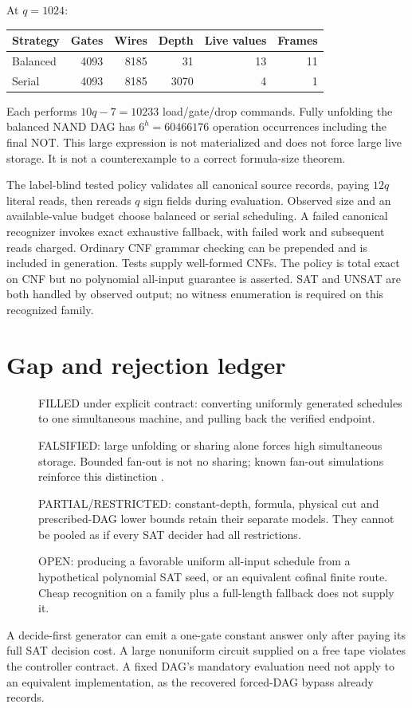 \documentclass[11pt]{article}
\begin{document}
At $q=1024$:
\begin{center}\begin{tabular}{lrrrrr}\toprule
Strategy&Gates&Wires&Depth&Live values&Frames\\\midrule
Balanced&4093&8185&31&13&11\\
Serial&4093&8185&3070&4&1\\\bottomrule
\end{tabular}\end{center}
Each performs $10q-7=10233$ load/gate/drop commands. Fully unfolding the balanced NAND DAG has $6^h=60466176$ operation occurrences including the final NOT. This large expression is not materialized and does not force large live storage. It is not a counterexample to a correct formula-size theorem.

The label-blind tested policy validates all canonical source records, paying $12q$ literal reads, then rereads $q$ sign fields during evaluation. Observed size and an available-value budget choose balanced or serial scheduling. A failed canonical recognizer invokes exact exhaustive fallback, with failed work and subsequent reads charged. Ordinary CNF grammar checking can be prepended and is included in generation. Tests supply well-formed CNFs. The policy is total exact on CNF but no polynomial all-input guarantee is asserted. SAT and UNSAT are both handled by observed output; no witness enumeration is required on this recognized family.

\section{Gap and rejection ledger}
\begin{description}
\item[] FILLED under explicit contract: converting uniformly generated schedules to one simultaneous machine, and pulling back the verified endpoint.
\item[] FALSIFIED: large unfolding or sharing alone forces high simultaneous storage. Bounded fan-out is not no sharing; known fan-out simulations reinforce this distinction \cite{fanout}.
\item[] PARTIAL/RESTRICTED: constant-depth, formula, physical cut and prescribed-DAG lower bounds retain their separate models. They cannot be pooled as if every SAT decider had all restrictions.
\item[] OPEN: producing a favorable uniform all-input schedule from a hypothetical polynomial SAT seed, or an equivalent cofinal finite route. Cheap recognition on a family plus a full-length fallback does not supply it.
\end{description}
A decide-first generator can emit a one-gate constant answer only after paying its full SAT decision cost. A large nonuniform circuit supplied on a free tape violates the controller contract. A fixed DAG's mandatory evaluation need not apply to an equivalent implementation, as the recovered forced-DAG bypass already records.
\end{document}
